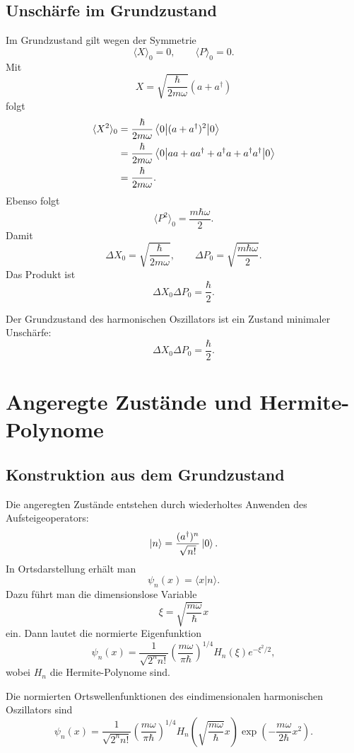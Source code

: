 \subsection{Unschärfe im Grundzustand}

Im Grundzustand gilt wegen der Symmetrie
\[
    \langle X\rangle_0=0,
    \qquad
    \langle P\rangle_0=0.
\]
Mit
\[
    X=\sqrt{\frac{\hbar}{2m\omega}}(a+a^\dagger)
\]
folgt
\begin{align*}
    \langle X^2\rangle_0
    &=\frac{\hbar}{2m\omega}
      \left\langle0\middle|(a+a^\dagger)^2\middle|0\right\rangle \\
    &=\frac{\hbar}{2m\omega}
      \left\langle0\middle|aa+aa^\dagger+a^\dagger a+a^\dagger a^\dagger\middle|0\right\rangle \\
    &=\frac{\hbar}{2m\omega}.
\end{align*}
Ebenso folgt
\[
    \langle P^2\rangle_0=\frac{m\hbar\omega}{2}.
\]
Damit
\[
    \Delta X_0=\sqrt{\frac{\hbar}{2m\omega}},
    \qquad
    \Delta P_0=\sqrt{\frac{m\hbar\omega}{2}}.
\]
Das Produkt ist
\[
    \Delta X_0\Delta P_0=\frac{\hbar}{2}.
\]

\begin{formulabox}
Der Grundzustand des harmonischen Oszillators ist ein Zustand minimaler Unschärfe:
\[
    \Delta X_0\Delta P_0=\frac{\hbar}{2}.
\]
\end{formulabox}

\section{Angeregte Zustände und Hermite-Polynome}

\subsection{Konstruktion aus dem Grundzustand}

Die angeregten Zustände entstehen durch wiederholtes Anwenden des Aufsteigeoperators:
\[
    \left|n\right\rangle=\frac{(a^\dagger)^n}{\sqrt{n!}}\left|0\right\rangle.
\]
In Ortsdarstellung erhält man
\[
    \psi_n(x)=\langle x|n\rangle.
\]
Dazu führt man die dimensionslose Variable
\[
    \xi=\sqrt{\frac{m\omega}{\hbar}}x
\]
ein. Dann lautet die normierte Eigenfunktion
\[
    \psi_n(x)=\frac{1}{\sqrt{2^n n!}}
    \left(\frac{m\omega}{\pi\hbar}\right)^{1/4}
    H_n(\xi)e^{-\xi^2/2},
\]
wobei $H_n$ die Hermite-Polynome sind.

\begin{formulabox}
Die normierten Ortswellenfunktionen des eindimensionalen harmonischen Oszillators sind
\[
    \psi_n(x)=\frac{1}{\sqrt{2^n n!}}
    \left(\frac{m\omega}{\pi\hbar}\right)^{1/4}
    H_n\left(\sqrt{\frac{m\omega}{\hbar}}x\right)
    \exp\left(-\frac{m\omega}{2\hbar}x^2\right).
\]
\end{formulabox}

